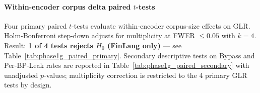 \documentclass[journal]{IEEEtran}
\begin{document}
\paragraph{Within-encoder corpus delta paired $t$-tests}
Four primary paired $t$-tests evaluate within-encoder corpus-size effects on GLR. Holm-Bonferroni step-down adjusts for multiplicity at FWER $\leq 0.05$ with $k{=}4$. Result: \textbf{1 of 4 tests rejects $H_0$ (FinLang only)} --- see Table~\ref{tab:phase1g_paired_primary}. Secondary descriptive tests on Bypass and Per-BP-Leak rates are reported in Table~\ref{tab:phase1g_paired_secondary} with unadjusted $p$-values; multiplicity correction is restricted to the 4 primary GLR tests by design.

\begin{table}[!t]
    \centering
    \caption{Primary paired $t$-tests, GLR rate, Holm-Bonferroni step-down adjusted. Sign convention $(60{-}90)$: negative deltas indicate the 90-corpus exceeds the 60-corpus.}
    \label{tab:phase1g_paired_primary}
\end{table}
\end{document}

